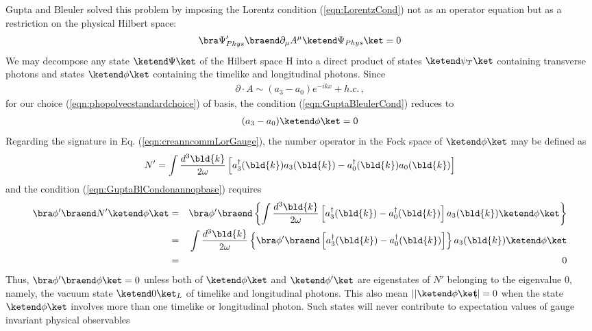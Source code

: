 Gupta and Bleuler solved this problem by imposing the Lorentz condition 
(\ref{eqn:LorentzCond}) not as an operator equation but
as a restriction on the physical Hilbert space:
\begin{eqnarray}
\bra \Psi_{Phys}' \braend
\partial_\mu A^\mu
\ketend \Psi_{Phys} \ket
=
0
\label{eqn:GuptaBleulerCond}
\end{eqnarray}
We may decompose any state $\ketend \Psi \ket$ of the Hilbert space {\cal H}
into a direct product of states $\ketend \psi_T \ket$ containing transverse photons and 
states $\ketend \phi \ket$ containing the timelike and longitudinal photons.
Since
\begin{eqnarray*}
\partial \cdot A
\sim
(a_3 - a_0)  e^{-ikx} + h.c.\,,
\end{eqnarray*}
for our choice (\ref{eqn:phopolvecstandardchoice}) of basis,
the condition (\ref{eqn:GuptaBleulerCond}) reduces to
\begin{eqnarray}
(a_3 - a_0) \ketend \phi \ket = 0
\label{eqn:GuptaBlCondonannopbase}
\end{eqnarray}
Regarding the signature in Eq. (\ref{eqn:creanncommLorGauge}), the number operator
in the Fock space of $\ketend \phi \ket$ may be defined as
\begin{eqnarray}
N' = \int
\frac{d^3 \bld{k}}{2\omega}
\left[
a^\dagger_3(\bld{k}) a_3(\bld{k}) 
- 
a^\dagger_0(\bld{k}) a_0(\bld{k})
\right]
\end{eqnarray}
and the condition (\ref{eqn:GuptaBlCondonannopbase})
requires
\begin{eqnarray}
\bra \phi' \braend
N' \ketend \phi \ket
&=&
\bra \phi' \braend
\left\{
\int
\frac{d^3 \bld{k}}{2\omega}
\left[
a^\dagger_3(\bld{k}) 
- 
a^\dagger_0(\bld{k}) 
\right]
a_3(\bld{k}) 
\ketend \phi \ket
\right\}
\nonumber\\
&=&
\int
\frac{d^3 \bld{k}}{2\omega}
\left\{
\bra \phi' \braend
\left[
a^\dagger_3(\bld{k}) 
- 
a^\dagger_0(\bld{k}) 
\right]
\right\}
a_3(\bld{k}) 
\ketend \phi \ket
\nonumber\\
&=&
0
\end{eqnarray}
Thus, $\bra \phi' \braend \phi \ket = 0$
unless both of $\ketend \phi \ket$ and $\ketend \phi' \ket$ are
eigenstates of  $N'$ belonging to the eigenvalue 0, namely,
the vacuum state $\ketend 0 \ket_L$ of timelike and longitudinal photons.
This also mean $||\ketend \phi \ket \!\!|| = 0$ when the state
$\ketend \phi \ket$ involves more than one timelike or longitudinal photon.
Such states will never contribute to expectation values of 
gauge invariant physical observables
